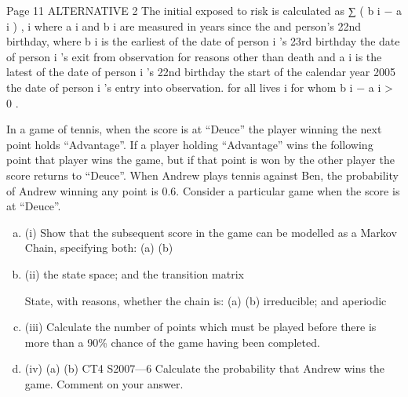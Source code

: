 \documentclass[a4paper,12pt]{article}
\begin{document}
\begin{enumerate}
Page 11%
ALTERNATIVE 2
The initial exposed to risk is calculated as
∑ ( b i − a i ) ,
i
where a i and b i are measured in years since the
and
person’s 22nd birthday,
where b i is the earliest of
the date of person i ’s 23rd birthday
the date of person i ’s exit from observation for reasons other than death
and a i is the latest of
the date of person i ’s 22nd birthday
the start of the calendar year 2005
the date of person i ’s entry into observation.
for all lives i for whom b i − a i > 0 .
\newpage

In a game of tennis, when the score is at “Deuce” the player winning the next point
holds “Advantage”. If a player holding “Advantage” wins the following point that
player wins the game, but if that point is won by the other player the score returns to
“Deuce”.
When Andrew plays tennis against Ben, the probability of Andrew winning any point
is 0.6. Consider a particular game when the score is at “Deuce”.
\begin{enumerate}[(a)]
\item (i)
Show that the subsequent score in the game can be modelled as a Markov
Chain, specifying both:
(a)
(b)
\item (ii)
the state space; and
the transition matrix

State, with reasons, whether the chain is:
(a)
(b)
irreducible; and
aperiodic

\item (iii) Calculate the number of points which must be played before there is more than
a 90\% chance of the game having been completed.

\item (iv) (a)
(b)
CT4 S2007—6
Calculate the probability that Andrew wins the game.
Comment on your answer.

\end{enumerate}


\end{enumerate}
\end{document}
